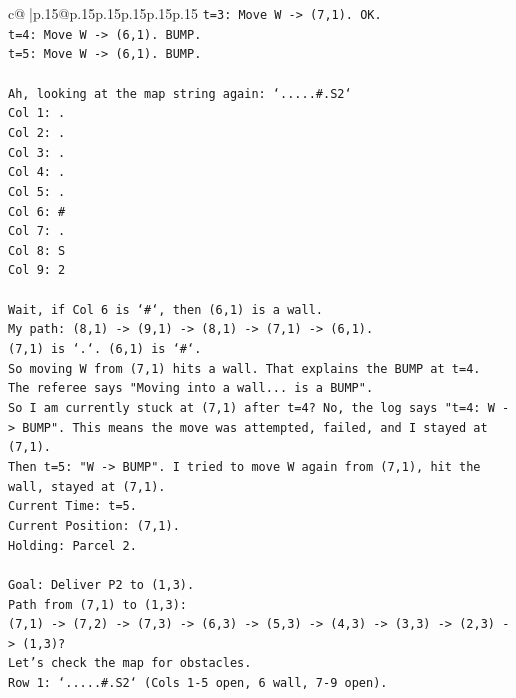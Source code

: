 \documentclass{article}
\begin{document}
{\begin{supertabular}{c@{$\;$}|p{.15\linewidth}@{}p{.15\linewidth}p{.15\linewidth}p{.15\linewidth}p{.15\linewidth}p{.15\linewidth}}
{{{\texttt{t=3: Move W {-}> (7,1). OK.} \\
\texttt{t=4: Move W {-}> (6,1). BUMP.} \\
\texttt{t=5: Move W {-}> (6,1). BUMP.} \\
\\ 
\texttt{Ah, looking at the map string again: `.....\#.S2`} \\
\texttt{Col 1: .} \\
\texttt{Col 2: .} \\
\texttt{Col 3: .} \\
\texttt{Col 4: .} \\
\texttt{Col 5: .} \\
\texttt{Col 6: \#} \\
\texttt{Col 7: .} \\
\texttt{Col 8: S} \\
\texttt{Col 9: 2} \\
\\ 
\texttt{Wait, if Col 6 is `\#`, then (6,1) is a wall.} \\
\texttt{My path: (8,1) {-}> (9,1) {-}> (8,1) {-}> (7,1) {-}> (6,1).} \\
\texttt{(7,1) is `.`. (6,1) is `\#`.} \\
\texttt{So moving W from (7,1) hits a wall. That explains the BUMP at t=4.} \\
\texttt{The referee says "Moving into a wall... is a BUMP".} \\
\texttt{So I am currently stuck at (7,1) after t=4? No, the log says "t=4: W {-}> BUMP". This means the move was attempted, failed, and I stayed at (7,1).} \\
\texttt{Then t=5: "W {-}> BUMP". I tried to move W again from (7,1), hit the wall, stayed at (7,1).} \\
\texttt{Current Time: t=5.} \\
\texttt{Current Position: (7,1).} \\
\texttt{Holding: Parcel 2.} \\
\\ 
\texttt{Goal: Deliver P2 to (1,3).} \\
\texttt{Path from (7,1) to (1,3):} \\
\texttt{(7,1) {-}> (7,2) {-}> (7,3) {-}> (6,3) {-}> (5,3) {-}> (4,3) {-}> (3,3) {-}> (2,3) {-}> (1,3)?} \\
\texttt{Let's check the map for obstacles.} \\
\texttt{Row 1: `.....\#.S2` (Cols 1{-}5 open, 6 wall, 7{-}9 open).} \\
}}}
\end{supertabular}}
\end{document}
